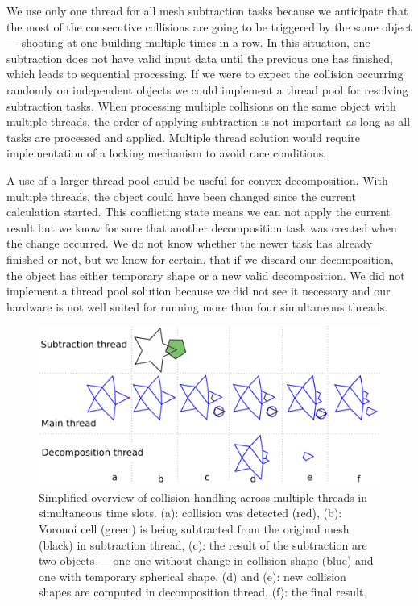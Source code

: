 We use only one thread for all mesh subtraction tasks because we anticipate that the most of the consecutive collisions are going to be triggered by the same object --- shooting at one building multiple times in a row. In this situation, one subtraction does not have valid input data until the previous one has finished, which leads to sequential processing. If we were to expect the collision occurring randomly on independent objects we could implement a thread pool for resolving subtraction tasks. When processing multiple collisions on the same object with multiple threads, the order of applying subtraction is not important as long as all tasks are processed and applied. Multiple thread solution would require implementation of a locking mechanism to avoid race conditions.

A use of a larger thread pool could be useful for convex decomposition. With multiple threads, the object could have been changed since the current calculation started. This conflicting state means we can not apply the current result but we know for sure that another decomposition task was created when the change occurred. We do not know whether the newer task has already finished or not, but we know for certain, that if we discard our decomposition, the object has either temporary shape or a new valid decomposition. We did not implement a thread pool solution because we did not see it necessary and our hardware  is not well suited for running more than four simultaneous threads.

\begin{figure}
        \centering
        \includegraphics[width=\textwidth]{img/object-progress}
       \caption{Simplified overview of collision handling across multiple threads in simultaneous time slots. (a): collision was detected (red), (b): Voronoi cell (green) is being subtracted from the original mesh (black) in subtraction thread, (c): the result of the subtraction are two objects --- one one without change in collision shape (blue) and one with temporary spherical shape, (d) and (e): new collision shapes are computed in decomposition thread, (f): the final result.}
        \label{fig:objectInThreads}
\end{figure}

